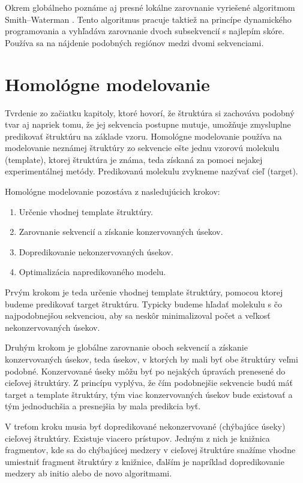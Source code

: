 \indent Okrem globálneho poznáme aj presné lokálne zarovnanie vyriešené algoritmom Smith–Waterman \cite{Smith81}. Tento algoritmus pracuje taktiež na princípe dynamického programovania a vyhľadáva zarovnanie dvoch subsekvencií s najlepím skóre. Používa sa na nájdenie podobných regiónov medzi dvomi sekvenciami.


\section{Homológne modelovanie}
Tvrdenie zo začiatku kapitoly, ktoré hovorí, že štruktúra si zachováva podobný tvar aj napriek tomu, že jej sekvencia postupne mutuje, umožňuje zmysluplne predikovať štruktúru na základe vzoru. Homológne modelovanie používa na modelovanie neznámej štruktúry zo sekvencie ešte jednu vzorovú molekulu (template), ktorej štruktúra je známa, teda získaná za pomoci nejakej experimentálnej metódy. Predikovanú molekulu zvykneme nazývať cieľ (target).

Homológne modelovanie pozostáva z nasledujúcich krokov:
\begin{enumerate}
\item Určenie vhodnej template štruktúry.
\item Zarovnanie sekvencií a získanie konzervovaných úsekov.
\item Dopredikovanie nekonzervovaných úsekov.
\item Optimalizácia napredikovaného modelu.
\end{enumerate}


\indent Prvým krokom je teda určenie vhodnej template štruktúry, pomocou ktorej budeme predikovať target štruktúru. Typicky budeme hľadať molekulu s čo najpodobnejšou sekvenciou, aby sa neskôr minimalizoval počet a veľkosť nekonzervovaných úsekov. 


\indent Druhým krokom je globálne zarovnanie oboch sekvencií a získanie konzervovaných úsekov, teda úsekov, v ktorých by mali byť obe štruktúry veľmi podobné. Konzervované úseky môžu byť po nejakých úpravách prenesené do cieľovej štruktúry. Z princípu vyplýva, že čím podobnejšie sekvencie budú máť target a template štruktúry, tým viac konzervovaných úsekov bude existovať a tým jednoduchšia a presnejšia by mala predikcia byť.


\indent V treťom kroku musia byť dopredikované nekonzervované (chýbajúce úseky) cieľovej štruktúry. Existuje viacero prístupov. Jedným z nich je knižnica fragmentov, kde sa do chýbajúcej medzery v cieľovej štruktúre snažíme vhodne umiestniť fragment štruktúry z knižnice, ďalším je napríklad dopredikovanie medzery ab initio alebo de novo algoritmami.


